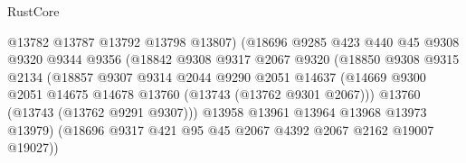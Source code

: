 \begin{lexlean}{RustCore}
\begin{coremodule}
                                    @13782
                                    @13787
                                    @13792
                                    @13798
                                    @13807)
                                  (@18696
                                    @9285
                                    @423
                                    @440
                                    @45
                                    @9308
                                    @9320
                                    @9344
                                    @9356
                                    (@18842
                                      @9308
                                      @9317
                                      @2067
                                      @9320
                                      (@18850
                                        @9308
                                        @9315
                                        @2134
                                        (@18857
                                          @9307
                                          @9314
                                          @2044
                                          @9290
                                          @2051
                                          @14637
                                          (@14669
                                            @9300
                                            @2051
                                            @14675
                                            @14678
                                            @13760
                                            (@13743 (@13762 @9301 @2067)))
                                          @13760
                                          (@13743 (@13762 @9291 @9307)))
                                        @13958
                                        @13961
                                        @13964
                                        @13968
                                        @13973
                                        @13979)
                                      (@18696
                                        @9317
                                        @421
                                        @95
                                        @45
                                        @2067
                                        @4392
                                        @2067
                                        @2162
                                        @19007
                                        @19027))

\end{coremodule}
\end{lexlean}
